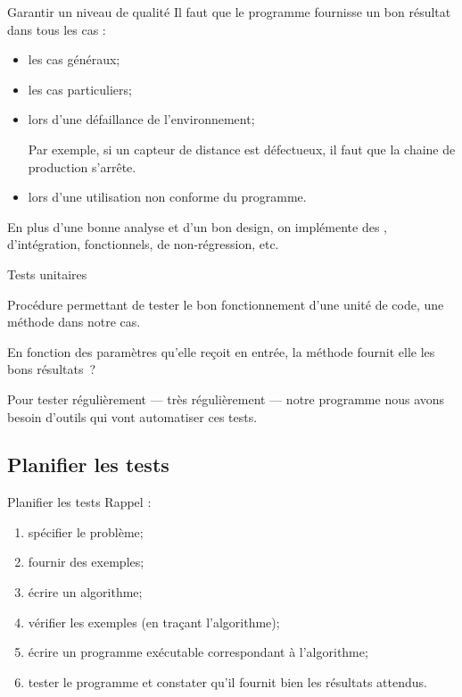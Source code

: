 \begin{hideedit}
\begin{frame}{Garantir un niveau de qualité}
  Il faut que le programme fournisse un bon résultat dans tous les cas :
  \begin{itemize}[<+->]
    \item les cas généraux;
    \item les cas particuliers;
    \item lors d'une défaillance de l'environnement;

      Par exemple, si un capteur de distance est défectueux, il faut que la
      chaine de production s'arrête.

    \item lors d'une utilisation non conforme du programme.
  \end{itemize}

  \pause
  En plus d'une bonne analyse et d'un bon design, on implémente des
  , d'intégration, fonctionnels, de
  non-régression, etc.
\end{frame}

\begin{frame}{Tests unitaires}
  \begin{definition}
    Procédure permettant de tester le bon fonctionnement d'une unité de
    code, une méthode  dans notre cas.
  \end{definition}

  En fonction des paramètres qu'elle reçoit en entrée, la méthode
  fournit elle les bons résultats~?

  \pause
  Pour tester régulièrement --- très régulièrement --- notre programme nous avons
  besoin d'outils qui vont automatiser ces tests.
\end{frame}

\subsection{Planifier les tests}
\begin{frame}{Planifier les tests}
  Rappel :
  \begin{enumerate}
    \item spécifier le problème;
    \item fournir des exemples;
    \item écrire un algorithme;
    \item vérifier les exemples (en traçant l'algorithme);
    \item écrire un programme exécutable correspondant à l'algorithme;
    \item tester le programme et constater qu'il fournit bien les résultats attendus.
  \end{enumerate}


\end{frame}
\end{hideedit}
